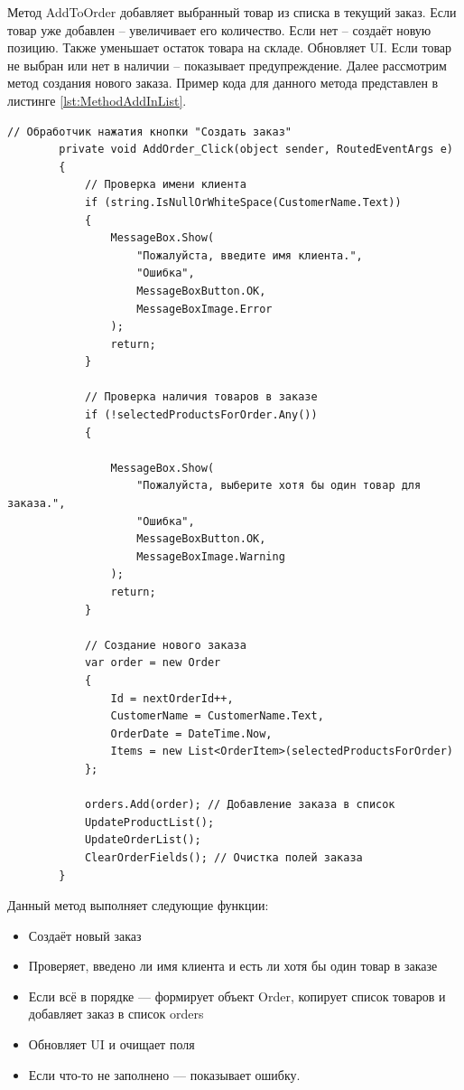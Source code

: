 \documentclass[12pt]{article}
\newcommand{\colorGIT}[1]{\textcolor{CtpGreen}{#1}}
\begin{document}
\pagebreak

Метод AddToOrder добавляет выбранный товар из списка в текущий заказ.
Если товар уже добавлен -- увеличивает его количество.
Если нет -- создаёт новую позицию.
Также уменьшает остаток товара на складе.
Обновляет UI.
Если товар не выбран или нет в наличии -- показывает предупреждение.
Далее рассмотрим метод создания нового заказа. Пример кода для данного метода
представлен в листинге \ref{lst:MethodAddInList}.


\begin{lstlisting}[style=csharp_catppuccin, caption=\colorGIT{\href{https://github.com/WebMasterIT/Csharp_Labs/blob/ec375afd16c0647b337cf3d8a79c8bef904fc1be/3lab/StoreManager/MainWindow.xaml.cs\#L186-L216}{Метод}} добавления товара в список выбранных товаров для заказа, label=lst:MethodAddInList]
        // Обработчик нажатия кнопки "Создать заказ"
        private void AddOrder_Click(object sender, RoutedEventArgs e)
        {
            // Проверка имени клиента
            if (string.IsNullOrWhiteSpace(CustomerName.Text))
            {
                MessageBox.Show(
                    "Пожалуйста, введите имя клиента.", 
                    "Ошибка", 
                    MessageBoxButton.OK, 
                    MessageBoxImage.Error
                );
                return;
            }

            // Проверка наличия товаров в заказе
            if (!selectedProductsForOrder.Any())
            {

                MessageBox.Show(
                    "Пожалуйста, выберите хотя бы один товар для заказа.", 
                    "Ошибка", 
                    MessageBoxButton.OK, 
                    MessageBoxImage.Warning
                );
                return;
            }

            // Создание нового заказа
            var order = new Order
            {
                Id = nextOrderId++,
                CustomerName = CustomerName.Text,
                OrderDate = DateTime.Now,
                Items = new List<OrderItem>(selectedProductsForOrder)
            };
             
            orders.Add(order); // Добавление заказа в список
            UpdateProductList();
            UpdateOrderList();
            ClearOrderFields(); // Очистка полей заказа
        }

\end{lstlisting}

\noindent Данный метод выполняет следующие функции:
\begin{itemize}
	\item Создаёт новый заказ
	\item Проверяет, введено ли имя клиента и есть ли хотя бы один товар в заказе
	\item Если всё в порядке — формирует объект Order, копирует список товаров и добавляет заказ в список orders
	\item Обновляет UI и очищает поля
	\item Если что-то не заполнено — показывает ошибку.
\end{itemize}
\end{document}
